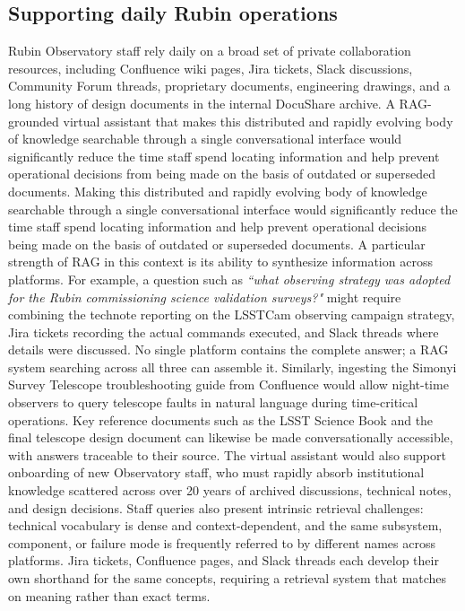 \subsection{Supporting daily Rubin operations}
Rubin Observatory staff rely daily on a broad set of private collaboration resources, including Confluence wiki pages, Jira tickets, Slack discussions, Community Forum threads, proprietary documents, engineering drawings, and a long history of design documents in the internal \gls{DocuShare} archive.
A \gls{RAG}-grounded virtual assistant that makes this distributed and rapidly evolving body of knowledge searchable through a single conversational interface would significantly reduce the time staff spend locating information and help prevent operational decisions from being made on the basis of outdated or superseded documents.
Making this distributed and rapidly evolving body of knowledge searchable through a single conversational interface would significantly reduce the time staff spend locating information and help prevent operational decisions being made on the basis of outdated or superseded documents.
A particular strength of \gls{RAG} in this context is its ability to synthesize information across platforms.
For example, a question such as \emph{``what observing strategy was adopted for the Rubin commissioning science validation surveys?"} might require combining the technote reporting on the \gls{LSSTCam} observing campaign strategy,  Jira tickets recording the actual commands executed, and Slack threads where details were discussed.
No single platform contains the complete answer; a \gls{RAG} system searching across all three can assemble it.
Similarly, ingesting the \gls{Simonyi Survey Telescope} troubleshooting guide from Confluence would allow night-time observers to query telescope faults in natural language during time-critical operations.
Key reference documents such as the \gls{LSST} Science Book and the final telescope design document can likewise be made conversationally accessible, with answers traceable to their source.
The virtual assistant would also support onboarding of new Observatory staff, who must rapidly absorb institutional knowledge scattered across over 20 years of archived discussions, technical notes, and design decisions.
Staff queries also present intrinsic retrieval challenges: technical vocabulary is dense and context-dependent, and the same subsystem, component, or failure mode is frequently referred to by different names across platforms. Jira tickets, Confluence pages, and Slack threads each develop their own shorthand for the same concepts, requiring a retrieval system that matches on meaning rather than exact terms.

